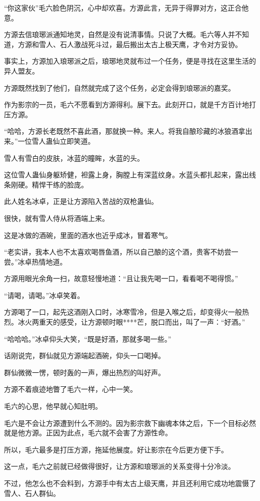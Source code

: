 \begin{this_body}
“你这家伙”毛六脸色阴沉，心中却欢喜。方源此言，无异于得罪对方，这正合他意。

方源去信琅琊派通知地灵，自然是没有说清事情。只说了大概。毛六等人并不知道，方源和雪人、石人激战死斗过，最后搬出太古上极天鹰，才令对方妥协。

事实上，方源加入琅琊派之后，琅琊地灵就布过一个任务，便是寻找在这里生活的异人盟友。

方源既然找到了他们，自然就完成了这个任务，必定会得到琅琊派的嘉奖。

作为影宗的一员，毛六不愿看到方源得利。展下去。此刻开口，就是千方百计地打压方源。

“哈哈，方源长老既然不喜此酒，那就换一种。来人。将我自酿珍藏的冰狼酒拿出来。”一位雪人蛊仙立即笑道。

雪人有雪白的皮肤，冰蓝的瞳眸，水蓝的头。

这位雪人蛊仙身躯矫健，袒露上身，胸膛上有深蓝纹身。水蓝头都扎起来，露出线条刚硬。精悍干练的脸庞。

此人姓名冰卓，正是让方源陷入苦战的双枪蛊仙。

很快，就有雪人侍从将酒端上来。

这是冰做的酒碗，里面的酒水也近乎成冰，冒着寒气。

“老实讲，我本人也不太喜欢喝唇鱼酒，所以自己酿的这个酒，贵客不妨尝一尝。”冰卓热情地道。

方源用眼光余角一扫，故意轻慢地道：“且让我先喝一口，看看喝不喝得惯。”

“请喝，请喝。”冰卓笑着。

方源喝了一口，起先这酒刚入口时，冰寒雪冷，但是入喉之后，却变得火一般热烈。冰火两重天的感受，让方源顿时眼****芒，脱口而出，叫了一声：“好酒。”

“哈哈哈。”冰卓仰头大笑，“既是好酒，那就多喝一些。”

话刚说完，群仙就见方源端起酒碗，仰头一口喝掉。

群仙微微一愣，顿时轰的一声，爆出热烈的叫好声。

方源不着痕迹地瞥了毛六一样，心中一笑。

毛六的心思，他早就心知肚明。

毛六是不会让方源遭到什么不测的。因为影宗救下幽魂本体之后，下一个目标必然就是他方源。正因为此点，毛六就不会害了方源性命。

所以，毛六最多是打压方源，拖延他展度。好让影宗在今后更方便下手。

这一点，毛六之前就已经做得很好，让方源和琅琊派的关系变得十分冷淡。

不过，他怎么也不会料到，方源手中有太古上级天鹰，并且还利用它成功地震慑了雪人、石人群仙。


\end{this_body}
